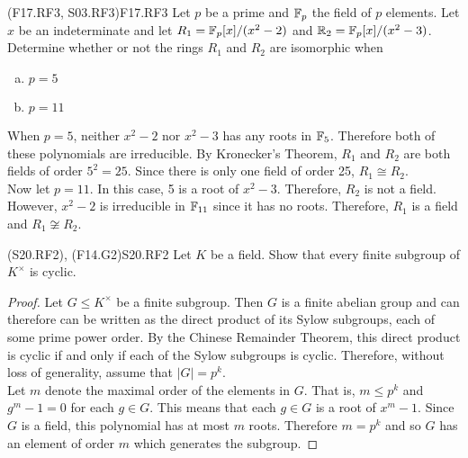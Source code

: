 \documentclass[../../AlgebraQualSolutions.tex]{subfiles}
\begin{document}
\begin{prob}{(F17.RF3, S03.RF3)}{F17.RF3}
    Let $p$ be a prime and $\mathbb{F}_p$ the field of $p$ elements. Let $x$ be an indeterminate and let $R_1 = \mathbb{F}_p[x]/(x^2 - 2)$ and $\mathbb{R}_2 = \mathbb{F}_p[x]/(x^2 - 3)$. Determine whether or not the rings $R_1$ and $R_2$ are isomorphic when
    \begin{enumerate}[(a)]
        \item $p = 5$
        \item $p = 11$
    \end{enumerate}
\end{prob}


\begin{solution}
When $p = 5$, neither $x^2 - 2$ nor $x^2 - 3$ has any roots in $\mathbb{F}_5$. Therefore both of these polynomials are irreducible. By Kronecker's Theorem, $R_1$ and $R_2$ are both fields of order $5^2 = 25$. Since there is only one field of order 25, $R_1 \cong R_2$.\\

Now let $p = 11$. In this case, 5 is a root of $x^2 - 3$. Therefore, $R_2$ is not a field. However, $x^2 - 2$ is irreducible in $\mathbb{F}_{11}$ since it has no roots. Therefore, $R_1$ is a field and $R_1 \not\cong R_2$.
\end{solution}

\begin{prob}{(S20.RF2), (F14.G2)}{S20.RF2}
Let $K$ be a field. Show that every finite subgroup of $K^\times$ is cyclic.
\end{prob}

\begin{proof}
	Let $G \leq K^\times$ be a finite subgroup. Then $G$ is a finite abelian group and can therefore can be written as the direct product of its Sylow subgroups, each of some prime power order. By the Chinese Remainder Theorem, this direct product is cyclic if and only if each of the Sylow subgroups is cyclic. Therefore, without loss of generality, assume that $|G| = p^k$.\\

	Let $m$ denote the maximal order of the elements in $G$. That is, $m \leq p^k$ and $g^m - 1 = 0$ for each $g \in G$. This  means that each $g \in G$ is a root of $x^m - 1$. Since $G$ is a field, this polynomial has at most $m$ roots. Therefore $m = p^k$ and so $G$ has an element of order $m$ which generates the subgroup.
\end{proof}
\end{document}
